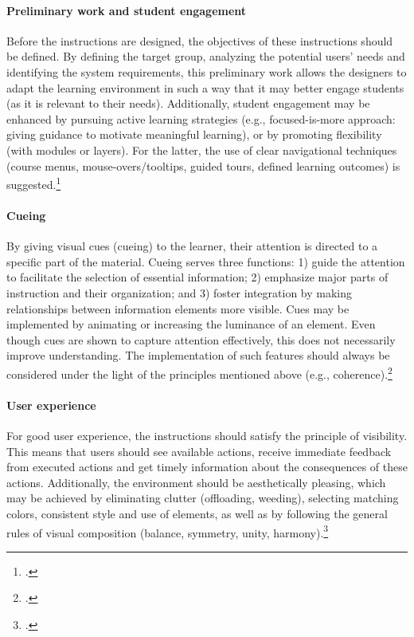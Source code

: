 \paragraph{Preliminary work and student engagement} Before the instructions are designed, the objectives of these instructions should be defined. By defining the target group, analyzing the potential users' needs and identifying the system requirements, this preliminary work allows the designers to adapt the learning environment in such a way that it may better engage students (as it is relevant to their needs). Additionally, student engagement may be enhanced by pursuing active learning strategies (e.g., focused-is-more approach: giving guidance to motivate meaningful learning), or by promoting flexibility (with modules or layers). For the latter, the use of clear navigational techniques (course menus, mouse-overs/tooltips, guided tours, defined learning outcomes) is suggested.\footcites[Cf.][p.202]{BlummerBestPracticesCreating2009}

\paragraph{Cueing} By giving visual cues (cueing) to the learner, their attention is directed to a specific part of the material. Cueing serves three functions: 1) guide the attention to facilitate the selection of essential information; 2) emphasize major parts of instruction and their organization; and 3) foster integration by making relationships between information elements more visible. Cues may be implemented by animating or increasing the luminance of an element. Even though cues are shown to capture attention effectively, this does not necessarily improve understanding. The implementation of such features should always be considered under the light of the principles mentioned above (e.g., coherence).\footcites[Cf.][pp.114 et seq]{deKoningFrameworkAttentionCueing2009}[cf.][chapter 2, paragraph 14]{ClarkElearningscienceinstruction2016}

\paragraph{User experience} For good user experience, the instructions should satisfy the principle of visibility. This means that users should see available actions, receive immediate feedback from executed actions and get timely information about the consequences of these actions. Additionally, the environment should be aesthetically pleasing, which may be achieved by eliminating clutter (offloading, weeding), selecting matching colors, consistent style and use of elements, as well as by following the general rules of visual composition (balance, symmetry, unity, harmony).\footcites[Cf.][pp. 16 et seq]{LeeScreenDesignGuidelines1999}[cf.][pp. 16 et seq]{Nadelhoffer10BestPractices}[cf.][p.20]{KirshInteractivitymultimediainterfaces1997}


